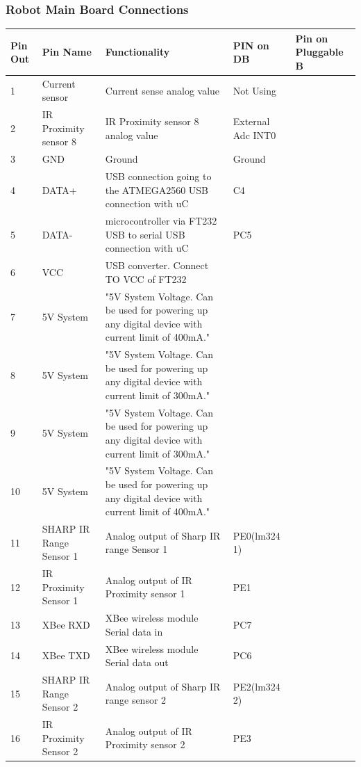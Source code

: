\documentclass[a4paper,12pt,oneside]{article}
\begin{document}
{		\subsubsection{\textbf{Robot Main Board Connections}}
			\begin{longtable}{|p{}|p{}|p{}|p{.1\textwidth}|p{}|}\hline
				Pin Out&	Pin Name&	Functionality&	PIN on DB& Pin on Pluggable B\\ \hline
				1&	Current sensor&	Current sense analog value&	Not Using\\ \hline
				2&	IR Proximity sensor 8&	IR Proximity sensor 8 analog value&	External Adc INT0\\ \hline
				3&	GND&	Ground	&Ground\\ \hline
				4&	DATA+&	USB connection going to the ATMEGA2560	USB connection with uC & C4\\ \hline
				5&	DATA-&	microcontroller via FT232 USB to serial	USB connection with uC &PC5\\ \hline
				6&	VCC& USB	converter.	Connect TO VCC of FT232&\\ \hline
				7&	5V System&	"5V System Voltage. Can be used for powering
				up any digital device with current limit of
				400mA."	&\\ \hline
				8&	5V System&	"5V System Voltage. Can be used for powering
				up any digital device with current limit of
				300mA."	&\\ \hline
				9&	5V System&	"5V System Voltage. Can be used for powering
				up any digital device with current limit of
				300mA."	&\\ \hline
				10&	5V System&	"5V System Voltage. Can be used for powering
				up any digital device with current limit of
				400mA."	&\\ \hline
				11&	SHARP IR Range Sensor 1	&Analog output of Sharp IR range Sensor 1&	PE0(lm324 1)\\ \hline
				12&	IR Proximity Sensor 1&	Analog output of IR Proximity sensor 1&	PE1\\ \hline
				13&	XBee RXD&	XBee wireless module Serial data in	&PC7\\ \hline
				14&	XBee TXD&	XBee wireless module Serial data out&	PC6\\ \hline
				15&	SHARP IR Range Sensor 2	& Analog output of Sharp IR range sensor 2&	PE2(lm324 2)\\ \hline
				16&	IR Proximity Sensor 2&	Analog output of IR Proximity sensor 2&	PE3\\ \hline

\end{longtable}}
\end{document}
